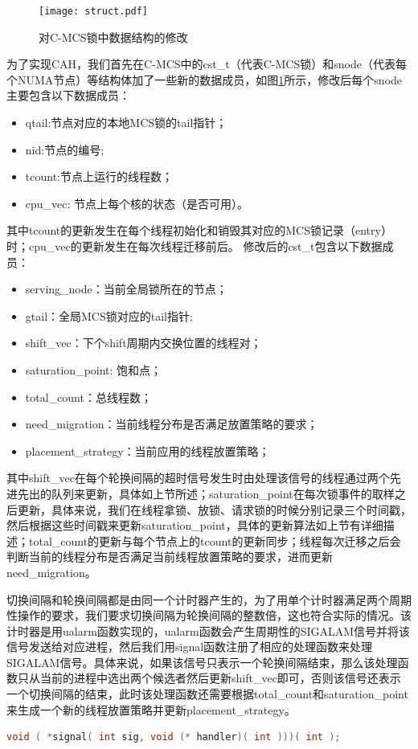 \begin{figure}[t]
	\centering
	\texttt{[image: struct.pdf]}
	\caption{对C-MCS锁中数据结构的修改}
	\label{Fig:struct}
\end{figure}

为了实现CAH，我们首先在C-MCS中的cst\_t（代表C-MCS锁）和snode（代表每个NUMA节点）等结构体加了一些新的数据成员，如图\ref{Fig:struct}所示，修改后每个snode主要包含以下数据成员：
\begin{itemize}
\item qtail:节点对应的本地MCS锁的tail指针；
\item nid:节点的编号;
\item tcount:节点上运行的线程数；
\item cpu\_vec: 节点上每个核的状态（是否可用）。
\end{itemize}
其中tcount的更新发生在每个线程初始化和销毁其对应的MCS锁记录（entry）时；cpu\_vec的更新发生在每次线程迁移前后。
修改后的cst\_t包含以下数据成员：
\begin{itemize}
\item serving\_node：当前全局锁所在的节点；
\item gtail：全局MCS锁对应的tail指针;
\item shift\_vec：下个shift周期内交换位置的线程对；
\item saturation\_point: 饱和点；
\item total\_count：总线程数；
\item need\_migration：当前线程分布是否满足放置策略的要求；
\item placement\_strategy：当前应用的线程放置策略；
\end{itemize}
其中shift\_vec在每个轮换间隔的超时信号发生时由处理该信号的线程通过两个先进先出的队列来更新，具体如上节所述；saturation\_point在每次锁事件的取样之后更新，具体来说，我们在线程拿锁、放锁、请求锁的时候分别记录三个时间戳，然后根据这些时间戳来更新saturation\_point，具体的更新算法如上节有详细描述；total\_count的更新与每个节点上的tcount的更新同步；线程每次迁移之后会判断当前的线程分布是否满足当前线程放置策略的要求，进而更新need\_migration。

切换间隔和轮换间隔都是由同一个计时器产生的，为了用单个计时器满足两个周期性操作的要求，我们要求切换间隔为轮换间隔的整数倍，这也符合实际的情况。该计时器是用ualarm函数实现的，ualarm函数会产生周期性的SIGALAM信号并将该信号发送给对应进程，然后我们用signal函数注册了相应的处理函数来处理SIGALAM信号。具体来说，如果该信号只表示一个轮换间隔结束，那么该处理函数只从当前的进程中选出两个候选者然后更新shift\_vec即可，否则该信号还表示一个切换间隔的结束，此时该处理函数还需要根据total\_count和saturation\_point来生成一个新的线程放置策略并更新placement\_strategy。
\begin{lstlisting}[language={C}, caption={注册信号处理函数}]
void ( *signal( int sig, void (* handler)( int )))( int );
\end{lstlisting}

